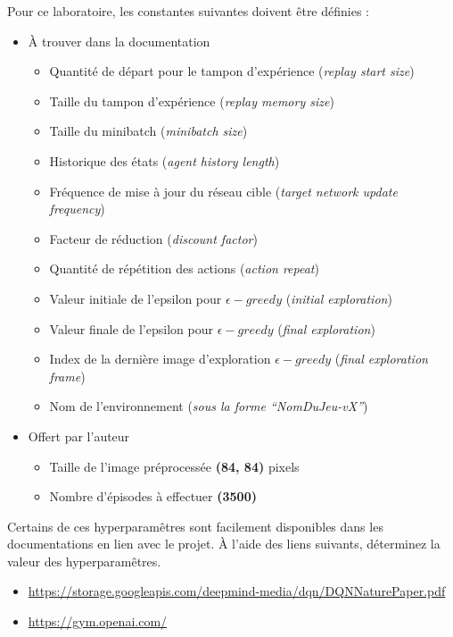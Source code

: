 \documentclass{article}
\begin{document}
\bigbreak
Pour ce laboratoire, les constantes suivantes doivent être définies :
\begin{itemize}
  \item À trouver dans la documentation
  \begin{itemize}
    \item Quantité de départ pour le tampon d'expérience (\textit{replay start size})
    \item Taille du tampon d'expérience (\textit{replay memory size})
    \item Taille du minibatch (\textit{minibatch size})
    \item Historique des états (\textit{agent history length})
    \item Fréquence de mise à jour du réseau cible (\textit{target network update frequency})
    \item Facteur de réduction (\textit{discount factor})
    \item Quantité de répétition des actions (\textit{action repeat})
    \item Valeur initiale de l’epsilon pour $\epsilon-greedy$ (\textit{initial exploration})
    \item Valeur finale de l’epsilon pour $\epsilon-greedy$ (\textit{final exploration})
    \item Index de la dernière image d'exploration $\epsilon-greedy$ (\textit{final exploration frame})
    \item Nom de l'environnement (\textit{sous la forme ``NomDuJeu-vX''})
  \end{itemize}
  \item Offert par l'auteur
  \begin{itemize}
    \item Taille de l'image préprocessée \textbf{(84, 84)} pixels
    \item Nombre d'épisodes à effectuer \textbf{(3500)}
  \end{itemize}
\end{itemize}

\bigbreak
Certains de ces hyperparamêtres sont facilement disponibles dans les documentations en lien avec le projet. À l'aide des liens suivants, déterminez la valeur des hyperparamêtres.
\begin{itemize}
  \item \href{https://storage.googleapis.com/deepmind-media/dqn/DQNNaturePaper.pdf}{https://storage.googleapis.com/deepmind-media/dqn/DQNNaturePaper.pdf}
  \item \href{https://gym.openai.com/}{https://gym.openai.com/}
\end{itemize}
\end{document}
